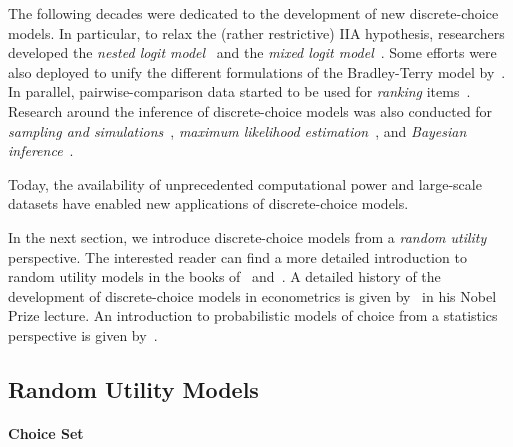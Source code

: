 The following decades were dedicated to the development of new discrete-choice models.
In particular, to relax the (rather restrictive) IIA hypothesis, researchers developed the \emph{nested logit model}~\citep{ben1973structure,williams1977formation,mcfadden1978modelling} and the \emph{mixed logit model}~\citep{boyd1980effect,cardell1980measuring,hensher2003mixed}.
Some efforts were also deployed to unify the different formulations of the Bradley-Terry model by~\citet{yellot1977relationship}.
In parallel, pairwise-comparison data started to be used for \emph{ranking} items~\citep{ford1957solution,buehlmann1963pairwise,wauthier2013efficient,negahban2017rank}.
Research around the inference of discrete-choice models was also conducted for \emph{sampling and simulations}~\citep{manski1981alternative,cosslett1981efficient}, \emph{maximum likelihood estimation}~\citep{hastie1998classification,hunter2004mm,maystre2015fast,vojnovic2016parameter}, and \emph{Bayesian inference}~\citep{guiver2009bayesian,caron2012efficient,houlsby2012collaborative}.

Today, the availability of unprecedented computational power and large-scale datasets have enabled new applications of discrete-choice models.

In the next section, we introduce discrete-choice models from a \emph{random utility} perspective.
The interested reader can find a more detailed introduction to random utility models in the books of~\citet[Chapter~1]{train2009discrete} and~\citet[Chapter~3]{hensher2005applied}.
A detailed history of the development of discrete-choice models in econometrics is given by~\citet{mcfadden2001economic} in his Nobel Prize lecture.
An introduction to probabilistic models of choice from a statistics perspective is given by~\citet[Chapter~1]{maystre2018efficient}.

\subsection{Random Utility Models}

\paragraph{Choice Set}

